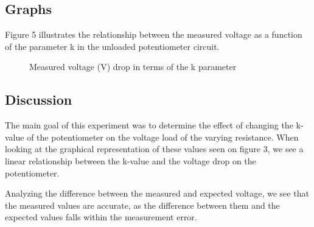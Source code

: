 \documentclass[a4paper]{article}
\newcommand{\unit}[1]{~\mathrm{#1}}
\begin{document}
\subsection{Graphs}
Figure 5 illustrates the relationship between the measured voltage as a function of the parameter 
k in the unloaded potentiometer circuit.
\begin{figure}[!ht]
    \centering
    \caption{Measured voltage (V) drop in terms of the k parameter}
    \label{fig:3}
\end{figure}

\subsection{Discussion}
The main goal of this experiment was to determine the effect of changing the
k-value of the potentiometer on the voltage load of the varying resistance. When
looking at the graphical representation of these values seen on figure 3, we see
a linear relationship between the k-value and the voltage drop on the
potentiometer.

Analyzing the difference between the measured and expected
voltage, we see that the measured values are accurate, as the difference between
them and the expected values falls within the measurement error. 
\newpage
\end{document}
